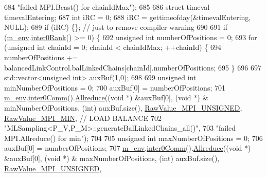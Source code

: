 \begin{DoxyCode}
684                         \textcolor{stringliteral}{"failed MPI.Bcast() for chainIdMax"});
685 
686   \textcolor{keyword}{struct }timeval timevalEntering;
687   \textcolor{keywordtype}{int} iRC = 0;
688   iRC = gettimeofday(&timevalEntering, NULL);
689   \textcolor{keywordflow}{if} (iRC) \{\}; \textcolor{comment}{// just to remove compiler warning}
690 
691   \textcolor{keywordflow}{if} (\hyperlink{class_q_u_e_s_o_1_1_m_l_sampling_a13f1ca4fe9f94822fe572a743eaced1d}{m\_env}.\hyperlink{class_q_u_e_s_o_1_1_base_environment_ae106b5bb8a80b655b88b3a26b1e7c185}{inter0Rank}() >= 0) \{
692     \textcolor{keywordtype}{unsigned} \textcolor{keywordtype}{int} numberOfPositions = 0;
693     \textcolor{keywordflow}{for} (\textcolor{keywordtype}{unsigned} \textcolor{keywordtype}{int} chainId = 0; chainId < chainIdMax; ++chainId) \{
694       numberOfPositions += balancedLinkControl.balLinkedChains[chainId].numberOfPositions;
695     \}
696 
697     std::vector<unsigned int> auxBuf(1,0);
698 
699     \textcolor{keywordtype}{unsigned} \textcolor{keywordtype}{int} minNumberOfPositions = 0;
700     auxBuf[0] = numberOfPositions;
701     \hyperlink{class_q_u_e_s_o_1_1_m_l_sampling_a13f1ca4fe9f94822fe572a743eaced1d}{m\_env}.\hyperlink{class_q_u_e_s_o_1_1_base_environment_a689e4d140c74d495d97eb498714a4b82}{inter0Comm}().\hyperlink{class_q_u_e_s_o_1_1_mpi_comm_a72e137e60ef8060efb1ee5fc874fa4b8}{Allreduce}((\textcolor{keywordtype}{void} *) &auxBuf[0], (\textcolor{keywordtype}{void} *) &
      minNumberOfPositions, (\textcolor{keywordtype}{int}) auxBuf.size(), \hyperlink{_mpi_comm_8h_a06cbfbc33436f6e0dc8a48ff3c49bdfc}{RawValue\_MPI\_UNSIGNED}, 
      \hyperlink{_mpi_comm_8h_a8e30f42fdac116861205e83e2aa18042}{RawValue\_MPI\_MIN}, \textcolor{comment}{// LOAD BALANCE}
702                                  \textcolor{stringliteral}{"MLSampling<P\_V,P\_M>::generateBalLinkedChains\_all()"},
703                                  \textcolor{stringliteral}{"failed MPI.Allreduce() for min"});
704 
705     \textcolor{keywordtype}{unsigned} \textcolor{keywordtype}{int} maxNumberOfPositions = 0;
706     auxBuf[0] = numberOfPositions;
707     \hyperlink{class_q_u_e_s_o_1_1_m_l_sampling_a13f1ca4fe9f94822fe572a743eaced1d}{m\_env}.\hyperlink{class_q_u_e_s_o_1_1_base_environment_a689e4d140c74d495d97eb498714a4b82}{inter0Comm}().\hyperlink{class_q_u_e_s_o_1_1_mpi_comm_a72e137e60ef8060efb1ee5fc874fa4b8}{Allreduce}((\textcolor{keywordtype}{void} *) &auxBuf[0], (\textcolor{keywordtype}{void} *) &
      maxNumberOfPositions, (\textcolor{keywordtype}{int}) auxBuf.size(), \hyperlink{_mpi_comm_8h_a06cbfbc33436f6e0dc8a48ff3c49bdfc}{RawValue\_MPI\_UNSIGNED}, 

\end{DoxyCode}
